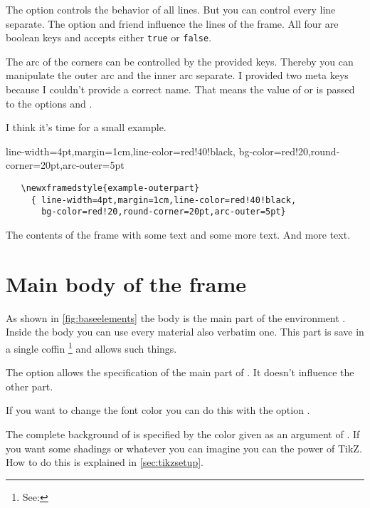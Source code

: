 \documentclass[openany,12pt,tocdepth=3]{ltx-md}
\begin{document}
The option  controls the behavior
of all lines. But you can control every line separate. The option 
 and friend influence the lines of the frame. All four are 
boolean keys and accepts either \texttt{true} or \texttt{false}.


The arc of the corners can be controlled by the provided keys. Thereby
you can manipulate the outer arc and the inner arc separate.
I provided two meta keys because I couldn't provide a correct name.
That means the value of  or  is passed
to the options  and . 

I think it's time for a small example.

\begin{ltxexample}[caption=Example outer part III,result=true,label=arc]
   { line-width=4pt,margin=1cm,line-color=red!40!black,
     bg-color=red!20,round-corner=20pt,arc-outer=5pt}
\begin{xframed}[style=example-outerpart]
 \begin{verbatim}
   \newxframedstyle{example-outerpart}
     { line-width=4pt,margin=1cm,line-color=red!40!black,
       bg-color=red!20,round-corner=20pt,arc-outer=5pt}
 \end{verbatim}
 The contents of the frame with some text
 and some more text. And more text.
\end{xframed}
\end{ltxexample}

\section{Main body of the frame}\label{sec:element-main}
As shown in \autoref{fig:baseelements} the body is the main part of
the environment . Inside the body you can use every
material also verbatim one. This part is save in a single coffin%
\footnote{See: }  and allows such things. 

The option  allows the specification of the main part of .
It doesn't influence the other part. 

If you want to change the font color you can do this with the option .

The complete background of  is specified by the color given
as an argument of . If you want some shadings or whatever
you can imagine you can the power of TikZ. How to do this
is explained in \autoref{sec:tikzsetup}.
\end{document}
